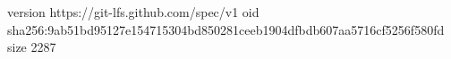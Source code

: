 version https://git-lfs.github.com/spec/v1
oid sha256:9ab51bd95127e154715304bd850281ceeb1904dfbdb607aa5716cf5256f580fd
size 2287
